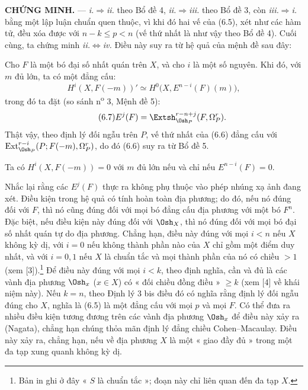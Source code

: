 \noindent\textbf{CHỨNG MINH.} --- \textit{i.}$\Rightarrow$\textit{ii.} theo
Bổ đề 4, \textit{ii.}$\Rightarrow$\textit{iii.} theo Bổ đề 3, còn
\textit{iii.}$\Rightarrow$\textit{i.} bằng một lập luận chuẩn quen thuộc,
vì khi đó hai vế của (6.5), xét như các hàm tử, đều xóa được với
$n-k\leq p<n$ (vế thứ nhất là như vậy theo Bổ đề 4). Cuối cùng, ta chứng minh
\textit{ii.}$\Leftrightarrow$\textit{iv.} Điều này suy ra từ hệ quả của
mệnh đề sau đây:

 Cho $F$ là một bó đại số nhất quán trên $X$, và cho
$i$ là một số nguyên. Khi đó, với $m$ đủ lớn, ta có một đẳng cấu:
\begin{equation}\tag{6.6}
  H^{i}(X,F(-m))'
  \simeq H^{0}\bigl(X,E^{n-i}(F)(m)\bigr),
\end{equation}
trong đó ta đặt (so sánh n\textsuperscript{o} 3, Mệnh đề 5):
\begin{equation}\tag{6.7}
  E^{j}(F)=\Extsh_{\Osh_P}^{r-n+j}(F,\Omega_P^{r}).
\end{equation}
Thật vậy, theo định lý đối ngẫu trên $P$, vế thứ nhất của (6.6)
đẳng cấu với
$\operatorname{Ext}_{\Osh_P}^{r-i}(P;F(-m),\Omega_P^{r})$, do đó (6.6) suy ra
từ Bổ đề 5.

 Ta có $H^{i}(X,F(-m))=0$ với $m$ đủ lớn nếu và chỉ nếu
$E^{n-i}(F)=0$.

Nhắc lại rằng các $E^{j}(F)$ thực ra không phụ thuộc vào phép nhúng xạ ảnh
đang xét. Điều kiện trong hệ quả có tính hoàn toàn địa phương; do đó,
nếu nó đúng đối với $F$, thì nó cũng đúng đối với mọi bó đẳng cấu địa phương
với một bó $F^{n}$. Đặc biệt, nếu điều kiện này đúng
đối với $\Osh_X$, thì nó đúng đối với mọi bó đại số nhất quán tự do địa phương.
Chẳng hạn, điều này đúng với mọi $i<n$ nếu $X$ không kỳ dị, với
$i=0$ nếu không thành phần nào của $X$ chỉ gồm một điểm duy nhất, và với $i=0,1$
nếu $X$ là chuẩn tắc và mọi thành phần của nó có chiều $>1$ (xem
[3]).\footnote{Bản in ghi ở đây « $S$ là chuẩn tắc »; đoạn này
chỉ liên quan đến đa tạp $X$.} Để điều này đúng với mọi
$i<k$, theo định nghĩa, cần và đủ là các vành địa phương
$\Osh_x$ ($x\in X$) có « đối chiều đồng điều » $\geq k$ (xem [4]
về khái niệm này). Nếu $k=n$, theo Định lý 3 bis điều đó có nghĩa rằng
định lý đối ngẫu đúng cho $X$, nghĩa là (6.5) là một đẳng cấu với
mọi $p$ và mọi $F$. Có thể đưa ra nhiều điều kiện tương đương trên
các vành địa phương $\Osh_x$ để điều này xảy ra (Nagata), chẳng hạn chúng
thỏa mãn định lý đẳng chiều Cohen--Macaulay. Điều này xảy ra,
chẳng hạn, nếu về địa phương $X$ là một « giao đầy đủ » trong một
đa tạp xung quanh không kỳ dị.

